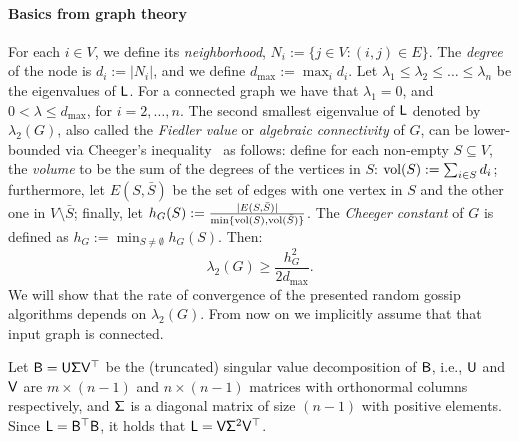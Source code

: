 \paragraph{Basics from graph theory}\label{sec:graph}
%
%
For each $i\in V$, we define its \emph{neighborhood}, $N_i:= \{j\in V: (i,j)\in E\}$. The \emph{degree} of the node is $d_i:=|N_i|$, and we define $d_{\max}:=\max_i d_i$.  Let $\lambda_1 \leq \lambda_2 \leq \ldots \leq \lambda_n$ be the eigenvalues of ${\mathsf{L} }$.  For a connected graph we have that $\lambda_1 = 0$,  and $0<\lambda \le d_{\max}$, for $i=2,\ldots,n$.  The second smallest eigenvalue of ${\mathsf{L} }$ denoted by $\lambda_2(G)$, also called the \emph{Fiedler value} or \emph{algebraic connectivity} of $G$, can be lower-bounded via Cheeger's inequality~\cite{book:spectralGraph} as follows: define for each non-empty $S\subseteq V$, the \emph{volume} to be the sum of the degrees of the vertices in $S$: $\operatorname{vol}(S) := \sum_{i\in S} d_i$; furthermore, let $E(S,\bar{S})$ be the set of edges with one vertex in $S$ and the other one in $V\setminus \bar{S}$; finally, let $h_G(S):= \frac{|E(S,\bar{S})|}{\min\{\operatorname{vol}(S), \operatorname{vol}(\bar{S})\} }$. The \emph{Cheeger constant} of $G$ is defined as $h_G:= \min_{S\neq \emptyset} h_G(S)$. Then:
\begin{equation}\label{eq:cheeger}
\lambda_2(G) \geq \frac{h_G^2}{2d_{\max}}.
\end{equation}
We will show that the rate of convergence of the presented random gossip algorithms depends on $\lambda_2(G)$. From now on we implicitly assume that that input graph is connected.

Let ${\mathsf{B} } = {\mathsf{U} } {\mathsf{\Sigma} } {\mathsf{V} }^\top$ be the (truncated) singular value decomposition of ${\mathsf{B} }$, i.e., ${\mathsf{U} }$ and ${\mathsf{V} }$ are $m\times (n-1)$ and $n\times (n-1)$ matrices with orthonormal columns respectively, and ${\mathsf{\Sigma} }$ is a diagonal matrix of size $(n-1)$ with positive elements. Since ${\mathsf{L} } = {\mathsf{B} }^\top {\ensuremath{\mathsf{B} }}$, it holds that ${\mathsf{L} } = {\mathsf{V} }{\mathsf{\Sigma} }^2 {\mathsf{V} }^\top$.
%
%
